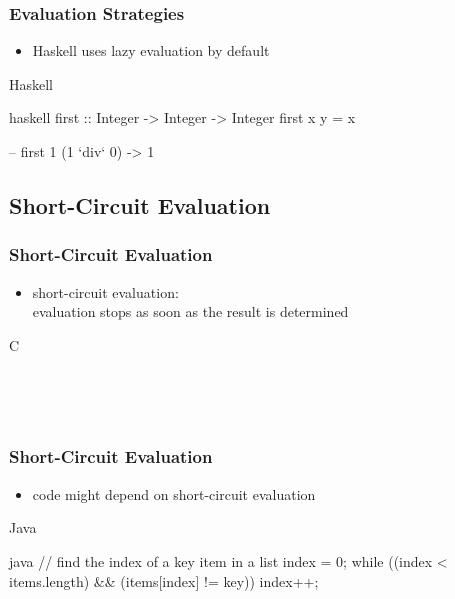 \documentclass[dvipsnames]{beamer}
\theoremstyle{plain}
\begin{document}
\begin{frame}[fragile]
  \frametitle{Evaluation Strategies}

  \begin{itemize}
    \item Haskell uses lazy evaluation by default
  \end{itemize}

  \begin{exampleblock}{Haskell}
    \begin{pygments}{haskell}
first :: Integer -> Integer -> Integer
first x y = x

-- first 1 (1 `div` 0) -> 1
    \end{pygments}
  \end{exampleblock}
\end{frame}

\subsection{Short-Circuit Evaluation}

\begin{frame}
  \frametitle{Short-Circuit Evaluation}

  \begin{itemize}
    \item \alert{short-circuit evaluation}:\\
      evaluation stops as soon as the result is determined
  \end{itemize}

  \pause
  \begin{exampleblock}{C}
    \\

    \bigskip
    \\

    \pause
    \bigskip
    \\
  \end{exampleblock}
\end{frame}

\begin{frame}[fragile]
  \frametitle{Short-Circuit Evaluation}

  \begin{itemize}
    \item code might depend on short-circuit evaluation
  \end{itemize}

  \begin{exampleblock}{Java}
    \begin{pygments}{java}
// find the index of a key item in a list
index = 0;
while ((index < items.length) && (items[index] != key))
    index++;
    \end{pygments}
  \end{exampleblock}
\end{frame}
\end{document}
